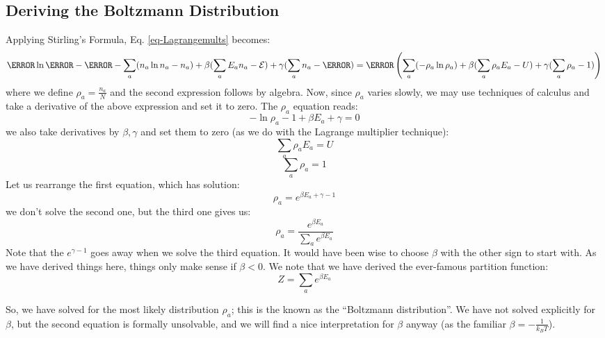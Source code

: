 \subsection{Deriving the Boltzmann Distribution}
Applying Stirling's Formula, Eq. \eqref{eq-Lagrangemults} becomes:
\begin{equation}
    \N\ln\N - \N - \sum_a(n_a \ln n_a - n_a) + \beta(\sum_a E_a n_a - \mathcal{E}) + \gamma(\sum_a n_a - \N) = \N\left(\sum_a(-\rho_a \ln \rho_a) + \beta(\sum_a \rho_a E_a - U) + \gamma(\sum_a \rho_a - 1)\right)
\end{equation}
where we define $\rho_a = \frac{n_a}{N}$ and the second expression follows by algebra. Now, since $\rho_a$ varies slowly, we may use techniques of calculus and take a derivative of the above expression and set it to zero. The $\rho_a$ equation reads:
\begin{equation}
    -\ln \rho_a - 1 + \beta E_a + \gamma = 0
\end{equation}
we also take derivatives by $\beta, \gamma$ and set them to zero (as we do with the Lagrange multiplier technique):
\begin{equation}
    \sum_a \rho_a E_a = U
\end{equation}
\begin{equation}
    \sum_a \rho_a = 1
\end{equation}
Let us rearrange the first equation, which has solution:
\begin{equation}
    \rho_a = e^{\beta E_a + \gamma - 1}
\end{equation}
we don't solve the second one, but the third one gives us:
\begin{equation}
    \rho_a = \frac{e^{\beta E_a}}{\sum_a e^{\beta E_a}}
\end{equation}
Note that the $e^{\gamma - 1}$ goes away when we solve the third equation. It would have been wise to choose $\beta$ with the other sign to start with. As we have derived things here, things only make sense if $\beta < 0$. We note that we have derived the ever-famous partition function:
\begin{equation}
    Z = \sum_a e^{\beta E_a}
\end{equation}

So, we have solved for the most likely distribution $\rho_a$; this is the known as the ``Boltzmann distribution''. We have not solved explicitly for $\beta$, but the second equation is formally unsolvable, and we will find a nice interpretation for $\beta$ anyway (as the familiar $\beta = -\frac{1}{k_B T}$). 

